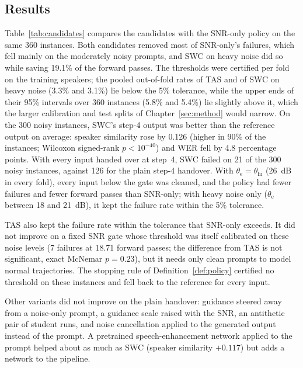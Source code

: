 \subsection{Results}
\label{app:cand-results}

Table~\ref{tab:candidates} compares the candidates with the SNR-only policy on the same 360 instances. Both candidates removed most of SNR-only's failures, which fell mainly on the moderately noisy prompts, and SWC on heavy noise did so while saving 19.1\% of the forward passes. The thresholds were certified per fold on the training speakers; the pooled out-of-fold rates of TAS and of SWC on heavy noise (3.3\% and 3.1\%) lie below the 5\% tolerance, while the upper ends of their 95\% intervals over 360 instances (5.8\% and 5.4\%) lie slightly above it, which the larger calibration and test splits of Chapter~\ref{sec:method} would narrow. On the 300 noisy instances, SWC's step-4 output was better than the reference output on average: speaker similarity rose by 0.126 (higher in 90\% of the instances; Wilcoxon signed-rank $p<10^{-40}$) and WER fell by 4.8 percentage points. With every input handed over at step~4, SWC failed on 21 of the 300 noisy instances, against 126 for the plain step-4 handover. With $\theta_{\mathrm{e}}=\theta_{\mathrm{hi}}$ (26~dB in every fold), every input below the gate was cleaned, and the policy had fewer failures and fewer forward passes than SNR-only; with heavy noise only ($\theta_{\mathrm{e}}$ between 18 and 21~dB), it kept the failure rate within the 5\% tolerance.

TAS also kept the failure rate within the tolerance that SNR-only exceeds. It did not improve on a fixed SNR gate whose threshold was itself calibrated on these noise levels (7 failures at 18.71 forward passes; the difference from TAS is not significant, exact McNemar $p=0.23$), but it needs only clean prompts to model normal trajectories. The stopping rule of Definition~\ref{def:policy} certified no threshold on these instances and fell back to the reference for every input.

Other variants did not improve on the plain handover: guidance steered away from a noise-only prompt, a guidance scale raised with the SNR, an antithetic pair of student runs, and noise cancellation applied to the generated output instead of the prompt. A pretrained speech-enhancement network applied to the prompt helped about as much as SWC (speaker similarity $+0.117$) but adds a network to the pipeline.

